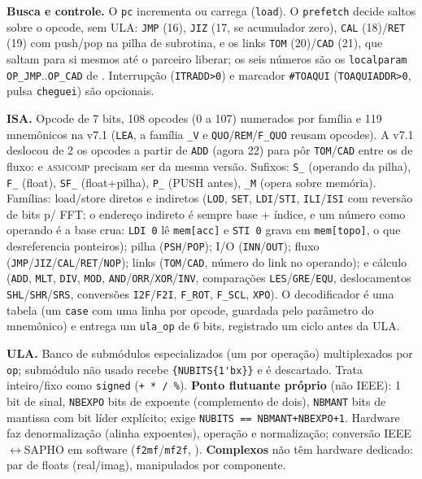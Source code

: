 \documentclass[11pt,a4paper,oneside]{article}
\newcommand{\file}[1]{\path{#1}}
\newcommand{\tool}[1]{\textsc{#1}}
\begin{document}
\textbf{Busca e controle.} O \lstinline|pc| incrementa ou carrega (\lstinline|load|). O \lstinline|prefetch| decide saltos sobre o opcode, sem ULA: \lstinline|JMP| (16), \lstinline|JIZ| (17, se acumulador zero), \lstinline|CAL| (18)/\lstinline|RET| (19) com push/pop na pilha de subrotina, e os links \lstinline|TOM| (20)/\lstinline|CAD| (21), que saltam para si mesmos até o parceiro liberar; os seis números são os \lstinline|localparam OP_JMP|..\lstinline|OP_CAD| de \file{core.v}. Interrupção (\lstinline|ITRADD>0|) e marcador \lstinline|#TOAQUI| (\lstinline|TOAQUIADDR>0|, pulsa \lstinline|cheguei|) são opcionais.

\textbf{ISA.} Opcode de 7 bits, 108 opcodes (0 a 107) numerados por família e 119 mnemônicos na v7.1 (\lstinline|LEA|, a família \lstinline|_V| e \lstinline|QUO|/\lstinline|REM|/\lstinline|F_QUO| reusam opcodes). A v7.1 deslocou de 2 os opcodes a partir de \lstinline|ADD| (agora 22) para pôr \lstinline|TOM|/\lstinline|CAD| entre os de fluxo:  e \tool{asmcomp} precisam ser da mesma versão. Sufixos: \lstinline|S_| (operando da pilha), \lstinline|F_| (float), \lstinline|SF_| (float+pilha), \lstinline|P_| (PUSH antes), \lstinline|_M| (opera sobre memória). Famílias: load/store diretos e indiretos (\lstinline|LOD|, \lstinline|SET|, \lstinline|LDI|/\lstinline|STI|, \lstinline|ILI|/\lstinline|ISI| com reversão de bits p/ FFT; o endereço indireto é sempre base + índice, e um número como operando é a base crua: \lstinline|LDI 0| lê \lstinline|mem[acc]| e \lstinline|STI 0| grava em \lstinline|mem[topo]|, o que desreferencia ponteiros); pilha (\lstinline|PSH|/\lstinline|POP|); I/O (\lstinline|INN|/\lstinline|OUT|); fluxo (\lstinline|JMP|/\lstinline|JIZ|/\lstinline|CAL|/\lstinline|RET|/\lstinline|NOP|); links (\lstinline|TOM|/\lstinline|CAD|, número do link no operando); e cálculo (\lstinline|ADD|, \lstinline|MLT|, \lstinline|DIV|, \lstinline|MOD|, \lstinline|AND|/\lstinline|ORR|/\lstinline|XOR|/\lstinline|INV|, comparações \lstinline|LES|/\lstinline|GRE|/\lstinline|EQU|, deslocamentos \lstinline|SHL|/\lstinline|SHR|/\lstinline|SRS|, conversões \lstinline|I2F|/\lstinline|F2I|, \lstinline|F_ROT|, \lstinline|F_SCL|, \lstinline|XPO|). O decodificador é uma tabela (um \lstinline|case| com uma linha por opcode, guardada pelo parâmetro do mnemônico) e entrega um \lstinline|ula_op| de 6 bits, registrado um ciclo antes da ULA.

\textbf{ULA.} Banco de submódulos especializados (um por operação) multiplexados por \lstinline|op|; submódulo não usado recebe \lstinline|{NUBITS{1'bx}}| e é descartado. Trata inteiro/fixo como \lstinline|signed| (\lstinline|+ * / %|). \textbf{Ponto flutuante próprio} (não IEEE): 1 bit de sinal, \lstinline|NBEXPO| bits de expoente (complemento de dois), \lstinline|NBMANT| bits de mantissa com bit líder explícito; exige \lstinline|NUBITS == NBMANT+NBEXPO+1|. Hardware faz denormalização (alinha expoentes), operação e normalização; conversão IEEE$\leftrightarrow$SAPHO em software (\lstinline|f2mf|/\lstinline|mf2f|, \file{t2t.c}). \textbf{Complexos} não têm hardware dedicado: par de floats (real/imag), manipulados por componente.
\end{document}
